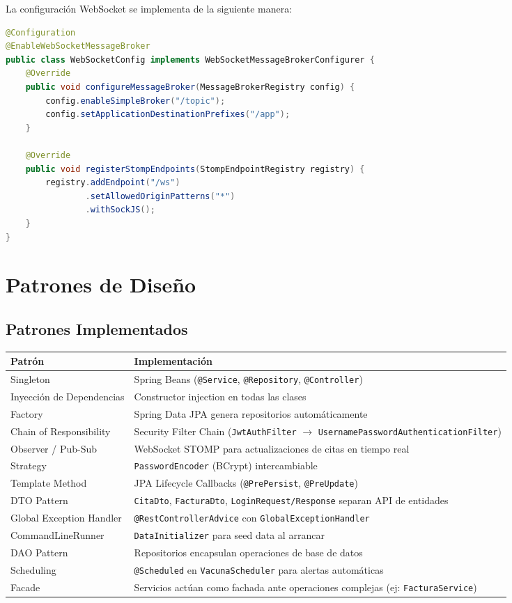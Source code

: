 La configuraci\'on WebSocket se implementa de la siguiente manera:

\begin{lstlisting}[language=Java, caption=Configuraci\'on WebSocket]
@Configuration
@EnableWebSocketMessageBroker
public class WebSocketConfig implements WebSocketMessageBrokerConfigurer {
    @Override
    public void configureMessageBroker(MessageBrokerRegistry config) {
        config.enableSimpleBroker("/topic");
        config.setApplicationDestinationPrefixes("/app");
    }

    @Override
    public void registerStompEndpoints(StompEndpointRegistry registry) {
        registry.addEndpoint("/ws")
                .setAllowedOriginPatterns("*")
                .withSockJS();
    }
}
\end{lstlisting}

\section{Patrones de Dise\~no}

\subsection{Patrones Implementados}

\begin{longtable}{|p{4cm}|p{10cm}|}
\hline
\textbf{Patr\'on} & \textbf{Implementaci\'on} \\
\hline
Singleton & Spring Beans (\texttt{@Service}, \texttt{@Repository}, \texttt{@Controller}) \\
\hline
Inyecci\'on de Dependencias & Constructor injection en todas las clases \\
\hline
Factory & Spring Data JPA genera repositorios autom\'aticamente \\
\hline
Chain of Responsibility & Security Filter Chain (\texttt{JwtAuthFilter} $\rightarrow$ \texttt{UsernamePasswordAuthenticationFilter}) \\
\hline
Observer / Pub-Sub & WebSocket STOMP para actualizaciones de citas en tiempo real \\
\hline
Strategy & \texttt{PasswordEncoder} (BCrypt) intercambiable \\
\hline
Template Method & JPA Lifecycle Callbacks (\texttt{@PrePersist}, \texttt{@PreUpdate}) \\
\hline
DTO Pattern & \texttt{CitaDto}, \texttt{FacturaDto}, \texttt{LoginRequest/Response} separan API de entidades \\
\hline
Global Exception Handler & \texttt{@RestControllerAdvice} con \texttt{GlobalExceptionHandler} \\
\hline
CommandLineRunner & \texttt{DataInitializer} para seed data al arrancar \\
\hline
DAO Pattern & Repositorios encapsulan operaciones de base de datos \\
\hline
Scheduling & \texttt{@Scheduled} en \texttt{VacunaScheduler} para alertas autom\'aticas \\
\hline
Facade & Servicios act\'uan como fachada ante operaciones complejas (ej: \texttt{FacturaService}) \\
\hline
\end{longtable}

